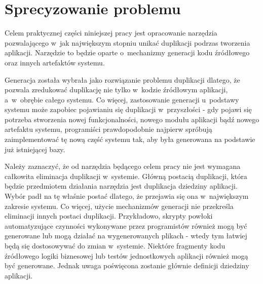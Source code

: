 \chapter{Sprecyzowanie problemu} \label{chap:the_problem}

Celem praktycznej części niniejszej pracy jest opracowanie narzędzia pozwalającego w~jak największym stopniu unikać duplikacji podrzas tworzenia aplikacji.
Narzędzie to będzie oparte o~mechanizmy generacji kodu źródłowego oraz innych artefaktów systemu.

Generacja została wybrała jako rozwiązanie problemu duplikacji dlatego, że pozwala zredukować duplikację nie tylko w~kodzie źródłowym aplikacji, a~w~obrębie całego systemu.
Co więcej, zastosowanie generacji u~podstawy systemu może zapobiec pojawianiu się duplikacji w~przyszłości - gdy pojawi się potrzeba stworzenia nowej funkcjonalności, nowego modułu aplikacji bądź nowego artefaktu systemu, programiści prawdopodobnie najpierw spróbują zaimplementować tę nową część systemu tak, aby była generowana na podstawie już istniejącej bazy.

Należy zaznaczyć, że od narzędzia będącego celem pracy nie jest wymagana całkowita eliminacja duplikacji w~systemie.
Główną postacią duplikacji, która będzie przedmiotem działania narzędzia jest duplikacja dziedziny aplikacji.
Wybór padł na tę właśnie postać dlatego, że przejawia się ona w~największym zakresie systemu.
Co więcej, użycie mechanizmów generacji nie przekreśla eliminacji innych postaci duplikacji.
Przykładowo, skrypty powłoki automatyzujące czynności wykonywane przez programistów również mogą być generowane lub mogą działać na wygenerowanych plikach - wtedy tym łatwiej będą się dostosowywać do zmian w~systemie.
Niektóre fragmenty kodu źródłowego logiki biznesowej lub testów jednostkowych aplikacji również mogą być generowane.
Jednak uwaga poświęcona zostanie głównie definicji dziedziny aplikacji.
